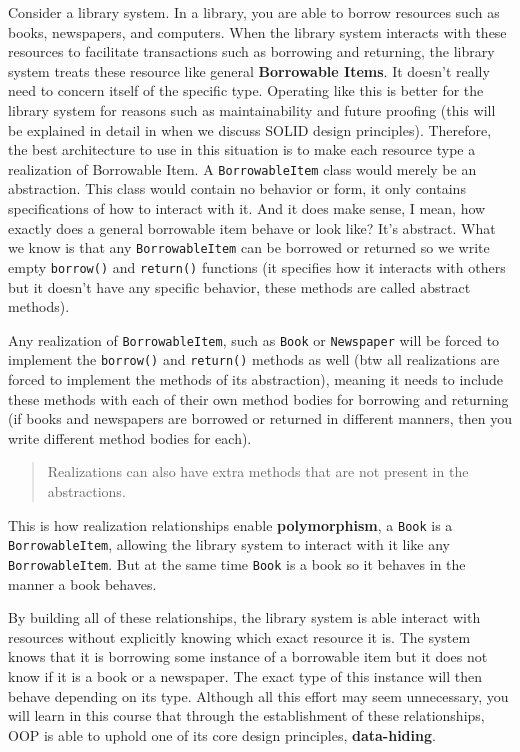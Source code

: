 Consider a library system. In a library, you are able to borrow
resources such as books, newspapers, and computers. When the library
system interacts with these resources to facilitate transactions such as
borrowing and returning, the library system treats these resource like
general \textbf{Borrowable Items}. It doesn't really need to concern
itself of the specific type. Operating like this is better for the
library system for reasons such as maintainability and future proofing
(this will be explained in detail in when we discuss SOLID design
principles). Therefore, the best architecture to use in this situation
is to make each resource type a realization of Borrowable Item. A
\texttt{BorrowableItem} class would merely be an abstraction. This class
would contain no behavior or form, it only contains specifications of
how to interact with it. And it does make sense, I mean, how exactly
does a general borrowable item behave or look like? It's abstract. What
we know is that any \texttt{BorrowableItem} can be borrowed or returned
so we write empty \texttt{borrow()} and \texttt{return()} functions (it
specifies how it interacts with others but it doesn't have any specific
behavior, these methods are called abstract methods).

Any realization of \texttt{BorrowableItem}, such as \texttt{Book} or
\texttt{Newspaper} will be forced to implement the \texttt{borrow()} and
\texttt{return()} methods as well (btw all realizations are forced to
implement the methods of its abstraction), meaning it needs to include
these methods with each of their own method bodies for borrowing and
returning (if books and newspapers are borrowed or returned in different
manners, then you write different method bodies for each).

\begin{quote}
Realizations can also have extra methods that are not present in the
abstractions.
\end{quote}

This is how realization relationships enable \textbf{polymorphism}, a
\texttt{Book} is a \texttt{BorrowableItem}, allowing the library system
to interact with it like any \texttt{BorrowableItem}. But at the same
time \texttt{Book} is a book so it behaves in the manner a book behaves.

By building all of these relationships, the library system is able
interact with resources without explicitly knowing which exact resource
it is. The system knows that it is borrowing some instance of a
borrowable item but it does not know if it is a book or a newspaper. The
exact type of this instance will then behave depending on its type.
Although all this effort may seem unnecessary, you will learn in this
course that through the establishment of these relationships, OOP is
able to uphold one of its core design principles, \textbf{data-hiding}.

